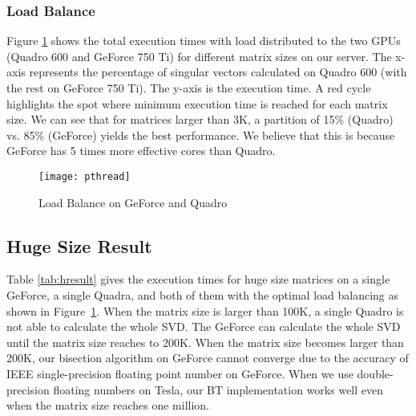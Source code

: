 \subsubsection{Load Balance}
Figure \ref{fig:pthread} shows the total execution times with load distributed to the two GPUs
(Quadro 600 and GeForce 750 Ti) for different matrix sizes on our server.
The x-axis represents the percentage of singular vectors calculated on Quadro 600 (with the rest on GeForce 750 Ti).
The y-axis is the execution time.
A red cycle
highlights the spot where minimum execution time is reached
for each matrix size. We can see that for matrices larger than
3K, a partition of 15\% (Quadro) vs. 85\% (GeForce) yields the
best performance. We believe that this is because 
GeForce has 5 times more effective cores than Quadro.
\begin{figure}[hbpt]
\centering
\texttt{[image: pthread]}
\caption{Load Balance on GeForce and Quadro}
\label{fig:pthread}
\vspace{-0.15in}
\end{figure}
\fi

\subsection{Huge Size Result}
Table \ref{tab:hresult} gives the execution times for huge size matrices on a single GeForce, a single Quadra, and both of them with the optimal load balancing as shown in Figure~\ref{fig:pthread}.
When the matrix size is larger than 100K, a single Quadro is not able to calculate the whole SVD.
The GeForce can calculate the whole SVD until the matrix size reaches to 200K.
When the matrix size becomes larger than 200K, our bisection algorithm on GeForce cannot converge due to the accuracy of IEEE single-precision floating point number on GeForce.
When we use double-precision floating numbers on Tesla, our BT implementation works well even when the matrix size reaches one million.

